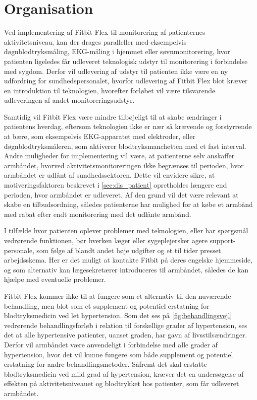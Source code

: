 \section{Organisation} \label{sec:dis_organisation}

Ved implementering af Fitbit Flex til monitorering af patienternes aktivitetsniveau, kan der drages paralleller med eksempelvis døgnblodtryksmåling, EKG-måling i hjemmet eller søvnmonitorering, hvor patienten ligeledes får udleveret teknologisk udstyr til monitorering i forbindelse med sygdom. Derfor vil udlevering af udstyr til patienten ikke være en ny udfordring for sundhedspersonalet, hvorfor udlevering af Fitbit Flex blot kræver en introduktion til teknologien, hvorefter forløbet vil være tilsvarende udleveringen af andet monitoreringsudstyr. 

Samtidig vil Fitbit Flex være mindre tilbøjeligt til at skabe ændringer i patientens hverdag, eftersom teknologien ikke er nær så krævende og forstyrrende at bære, som eksempelvis EKG-apparatet med elektroder, eller døgnblodtryksmåleren, som aktiverer blodtryksmanchetten med et fast interval. Andre muligheder for implementering vil være, at patienterne selv anskaffer armbåndet, hvorved aktivitetsmonitoreringen ikke begrænses til perioden, hvor armbåndet er udlånt af sundhedssektoren. Dette vil envidere sikre, at motiveringsfaktoren beskrevet i \autoref{sec:dis_patient} opretholdes længere end perioden, hvor armbåndet er udleveret. Af den grund vil det være relevant at skabe en tilbudsordning, således patienterne har mulighed for at købe et armbånd med rabat efter endt monitorering med det udlånte armbånd.

I tilfælde hvor patienten oplever problemer med teknologien, eller har spørgsmål vedrørende funktionen, bør hverken læger eller sygeplejersker agere support-personale, som følge af blandt andet høje udgifter og et til tider presset arbejdsskema. Her er det muligt at kontakte Fitbit på deres engelske hjemmeside, og som alternativ kan lægesekretærer introduceres til armbåndet, således de kan hjælpe med eventuelle problemer.

Fitbit Flex kommer ikke til at fungere som et alternativ til den nuværende behandling, men blot som et supplement og potentiel erstatning for blodtryksmedicin ved let hypertension. Som det ses på \autoref{fig:behandlingsvejl} vedrørende behandlingsforløb i relation til forskellige grader af hypertension, ses det at alle hypertensive patienter, uanset graden, har gavn af livsstilsændringer. Derfor vil armbåndet være anvendeligt i forbindelse med alle grader af hypertension, hvor det vil kunne fungere som både supplement og potentiel erstatning for andre behandlingsmetoder. Såfremt det skal erstatte blodtryksmedicin ved mild grad af hypertension, kræver det en undersøgelse af effekten på aktivitetsniveauet og blodtrykket hos patienter, som får udleveret armbåndet.


